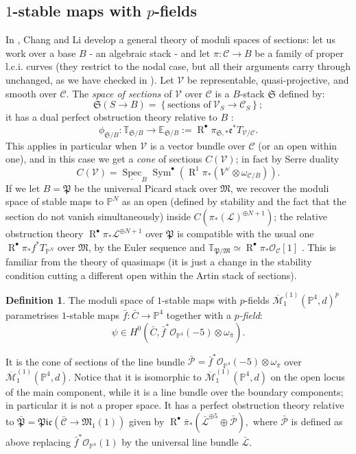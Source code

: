 \documentclass[11pt]{amsart}
\newcommand{\oM}{\overline{\mathcal{M}}}
\newcommand{\PP}{\mathbb P}
\newcommand{\OO}{\mathcal{O}}
\renewcommand{\to}{\rightarrow}
\newcommand{\MM}{\mathfrak M}
\newcommand{\Spec}{\operatorname{Spec}}
\newcommand{\R}{\operatorname{R}^{\bullet}}
\newcommand{\cC}{\mathcal{C}}
\theoremstyle{definition}
\theoremstyle{definition}
\newtheorem{dfn}[thm]{Definition}
\begin{document}
\subsection{$1$-stable maps with $p$-fields} In \cite{CLpfields}, Chang and Li develop a general theory of moduli spaces of sections: let us work over a base $B$ - an algebraic stack - and let $\pi\colon \cC\to B$ be a family of proper l.c.i. curves (they restrict to the nodal case, but all their arguments carry through unchanged, as we have checked in \cite[\S 3]{BCM}). Let $\mathcal V$ be representable, quasi-projective, and smooth over $\cC$. The \emph{space of sections} of $\mathcal V$ over $\cC$ is a $B$-stack $\mathfrak S$ defined by:
 \[\mathfrak{S}(S\to B)=\left\{\text{sections of}\ \mathcal V_S\to\cC_S\right\};\]
it has a dual perfect obstruction theory relative to $B$ \cite[Proposition 2.5]{CLpfields}:
\[ \phi_{\mathfrak S/B}\colon \mathbb T_{\mathfrak S/B}\to \mathbb E_{\mathfrak S/B}:=\R\pi_{\mathfrak S,*}\mathfrak e^* T_{\mathcal V/\cC}.\]
This applies in particular when $\mathcal V$ is a vector bundle over $\mathcal C$ (or an open within one), and in this case we get a \emph{cone} of sections $C(\mathcal V)$; in fact by Serre duality \[C(\mathcal V)=\underline{\Spec}_B\operatorname{Sym}^\bullet(\operatorname{R}^1\pi_* (V^\vee\otimes \omega_{\mathcal C/B})).\] If we let $B=\mathfrak{P}$ be the universal Picard stack over $\MM$, we recover the moduli space of stable maps to $\PP^N$ as an open (defined by stability and the fact that the section do not vanish simultaneously) inside $C(\pi_*(\mathcal L)^{\oplus N+1})$; the relative obstruction theory $\R\pi_*\mathcal L^{\oplus N+1}$ over $\mathfrak{P}$ is compatible with the usual one $\R\pi_*f^*T_{\PP^N}$  over $\MM$, by the Euler sequence and $\mathbb T_{\mathfrak P/\MM}\simeq\R\pi_*\OO_{\mathcal C}[1]$ \cite[Lemma 2.8]{CLpfields}. This is familiar from the theory of quasimaps (it is just a change in the stability condition cutting a different open within the Artin stack of sections).
\begin{dfn}
 The moduli space of $1$-stable maps with $p$-fields $\oM_1^{(1)}(\PP^4,d)^p$ parametrises $1$-stable maps $\bar{f}\colon\bar{C}\to\PP^4$ together with a \emph{$p$-field}: \[\psi \in  H^0(\bar{C},\bar{f}^*\OO_{\PP^4}(-5)\otimes\omega_{\bar{\pi}}).\]
\end{dfn}
 \noindent It is the cone of sections of the line bundle $\bar{\mathcal P}=\bar{f}^*\OO_{\PP^4}(-5)\otimes\omega_{\bar{\pi}}$ over $\oM_1^{(1)}(\PP^4,d)$. Notice that it is isomorphic to $\oM_1^{(1)}(\PP^4,d)$ on the open locus of the main component, while it is a line bundle over the boundary components; in particular it is not a proper space. It has a perfect obstruction theory relative to $\bar{\mathfrak P}=\mathfrak{Pic}(\bar{\mathcal C}\to\MM_1(1))$ given by $\R\bar{\pi}_*(\bar{\mathcal L}^{\oplus 5}\oplus \bar{\mathcal P}),$
 where $\bar{\mathcal P}$ is defined as above replacing $\bar{f}^*\OO_{\PP^4}(1)$ by the universal line bundle $\bar{\mathcal L}$.
\end{document}
